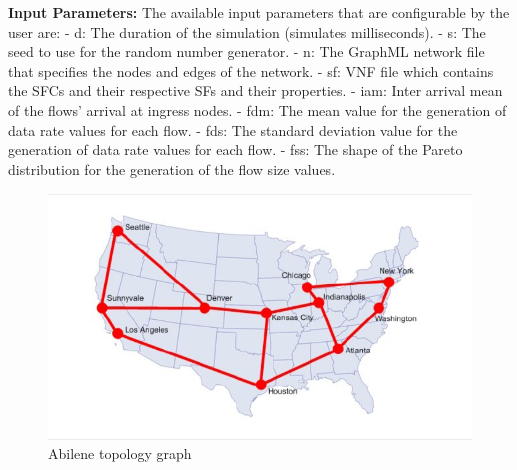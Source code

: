 \textbf{Input Parameters:} 
The available input parameters that are configurable by the user are: - d: The duration of the simulation (simulates milliseconds). - s: The seed to use for the random number
generator. - n: The GraphML network file that specifies the nodes and edges of the
 network. - sf: VNF file which contains the SFCs and their respective SFs and their properties. - iam: Inter arrival mean of the flows' arrival at ingress nodes. - fdm: The
 mean value for the generation of data rate values for each flow. - fds: The standard
deviation value for the generation of data rate values for each flow. - fss: The shape of the Pareto distribution for the generation of the flow size values.

\begin{figure}[h]
    \centering
    \includegraphics[width=1\textwidth]{abilene_real}
    \caption{Abilene topology graph}
    \label{fig:abilene_real}
\end{figure}


